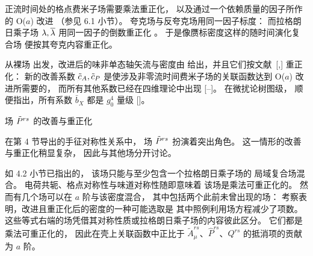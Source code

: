 正流时间处的格点费米子场需要乘法重正化，
以及通过一个依赖质量的因子所作的 O($a$) 改进
（参见 6.1 小节）。
夸克场与反夸克场用同一因子标度：
而拉格朗日乘子场 $\lambda,\overline{\lambda}$
用同一因子的倒数重正化%
\kern1pt。
于是像赝标密度这样的随时间演化复合场
便按其夸克内容重正化。

从裸场
出发，改进后的味非单态轴矢流与密度由
给出，并且它们按文献~[\cite{SFimp},\cite{ImpNonD}] 重正化：
新的改善系数 $\tilde{c}_A,\tilde{c}_P$
是使涉及非零流时间费米子场的关联函数达到 O($a$) 改进所需要的，
而所有其他系数已经在四维理论中出现
[\cite{SW}--\cite{ImpNonD}]。
在微扰论树图级，
顺便指出，所有系数 $\bar{b}_X$ 都是 $g_0^4$ 量级
[\cite{ImpNonD}]。


 场 $\tilde{P}^{rs}$ 的改善与重正化

在第 4 节导出的手征对称性关系中，
场 $\tilde{P}^{rs}$ 扮演着突出角色。
这一情形的改善与重正化稍显复杂，
因此与其他场分开讨论。

如 4.2 小节已指出的，
该场只能与至少包含一个拉格朗日乘子场的
局域复合场混合。
电荷共轭、格点对称性与味道对称性随即意味着
该场是乘法可重正化的。
然而有几个场可以在 $a$ 阶与该密度混合，
其中包括两个此前未曾出现的场：
考察表明，改进且重正化后的密度的一种可能选取是
其中照例利用场方程减少了项数。
这些等式右端的场凭借其对称性质或拉格朗日乘子场的内容彼此区分。
它们都是乘法可重正化的，
因此在壳上关联函数中正比于
$\tilde{A}_{\mu}^{rs}$、$\hat{P}^{rs}$、$Q^{rs}$
的抵消项的贡献为 $a$ 阶。

